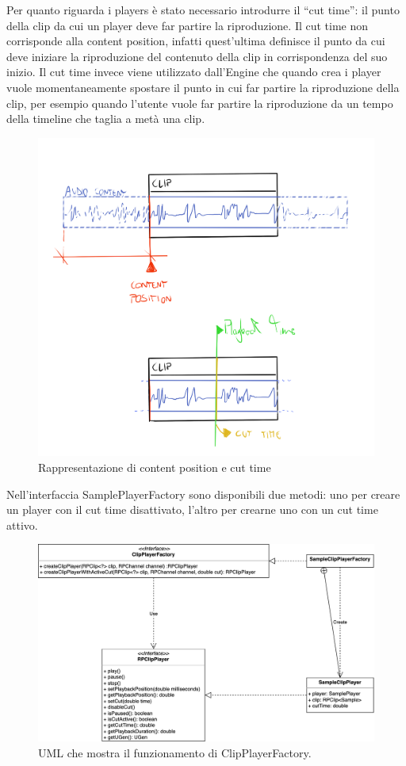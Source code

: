 \documentclass[a4paper,12pt]{report}
\begin{document}
Per quanto riguarda i players è stato necessario introdurre il “cut time”:
il punto della clip da cui un player deve far partire la riproduzione.
Il cut time non corrisponde alla content position, infatti quest’ultima definisce il punto da cui deve iniziare la riproduzione del contenuto della clip in corrispondenza del suo inizio. Il cut time invece viene utilizzato dall’Engine che quando crea i player vuole momentaneamente spostare il punto in cui far partire la riproduzione della clip, per esempio quando l’utente vuole far partire la riproduzione da un tempo della timeline che taglia a metà una clip.

\begin{figure}[H]
\centering{}
\includegraphics[scale=0.27]{img/clipModel.png}
\caption{Rappresentazione di content position e cut time}
\end{figure}

Nell'interfaccia SamplePlayerFactory sono disponibili due metodi: uno per creare un player con il cut time disattivato, l’altro per crearne uno con un cut time attivo.

\begin{figure}[H]
\centering{}
\includegraphics[width=\textwidth]{img/clipplayer.png}
\caption{UML che mostra il funzionamento di ClipPlayerFactory.}
\end{figure}
\end{document}
